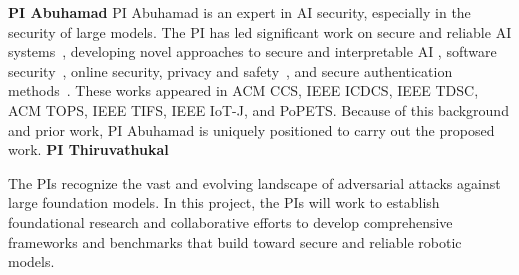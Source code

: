 \textbf{PI Abuhamad}
PI Abuhamad is an expert in AI security, especially in the security of large models. 
The PI has led significant work on secure and reliable AI systems~\cite{abuhamad2018large,abuhamad2020autosen,alasmary2020soteria,abuhamad2020multi,abusnaina2021dl,abuhamad2021large,abdukhamidov2023hardening,juraev2024unmasking,juraev2024impact,alawami2024motionid,abdukhamidov2024singleadv}, developing novel approaches to secure and interpretable AI \cite{abdukhamidov2023hardening,abusnaina2021dl,abdukhamidov2024singleadv,abdukhamidov2025stealthy,abuhamad2025nlp,abuhamad2025vit}, software security~\cite{abuhamad2018large,abuhamad2018large,abuhamad2020multi}, online security, privacy and safety~\cite{khan2023identification,reyes2023webtracker,shao2023lightweight,abuhamad2025shield}, and secure authentication methods~\cite{abuhamad2020autosen,alawami2024motionid}. 
These works appeared in ACM CCS, IEEE ICDCS, IEEE TDSC, ACM TOPS, IEEE TIFS, IEEE IoT-J, and PoPETS.  Because of this background and prior work, PI Abuhamad is uniquely positioned to carry out the proposed work.
\textbf{PI Thiruvathukal}

The PIs recognize the vast and evolving landscape of adversarial attacks against large foundation models. 
In this project, the PIs will work to establish foundational research and collaborative efforts to develop comprehensive frameworks and benchmarks that build toward secure and reliable robotic models. 

